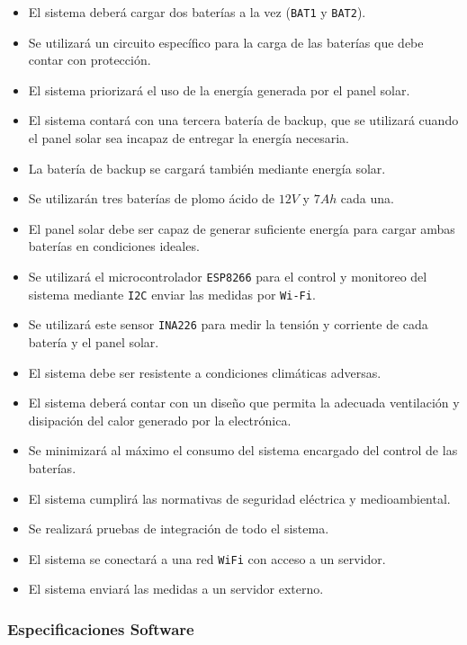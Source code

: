 \begin{itemize}
    \item El sistema deberá cargar dos baterías a la vez (\texttt{BAT1} y \texttt{BAT2}).
    \item Se utilizará un circuito específico para la carga de las baterías que debe contar con protección.
    \item El sistema priorizará el uso de la energía generada por el panel solar.
    \item El sistema contará con una tercera batería de backup, que se utilizará cuando el panel solar sea incapaz de entregar la energía necesaria.
    \item La batería de backup se cargará también mediante energía solar.
    \item Se utilizarán tres baterías de plomo ácido de $12 V$ y $7 Ah$ cada una. 
    \item El panel solar debe ser capaz de generar suficiente energía para cargar ambas baterías en condiciones ideales.
    \item Se utilizará el microcontrolador \texttt{ESP8266} para el control y monitoreo del sistema mediante \texttt{I2C} enviar las medidas por \texttt{Wi-Fi}.
    \item Se utilizará este sensor \texttt{INA226} para medir la tensión y corriente de cada batería y el panel solar.
    \item El sistema debe ser resistente a condiciones climáticas adversas. 
    \item El sistema deberá contar con un diseño que permita la adecuada ventilación y disipación del calor generado por la electrónica.
    \item Se minimizará al máximo el consumo del sistema encargado del control de las baterías.
    \item El sistema cumplirá las normativas de seguridad eléctrica y medioambiental.
    \item Se realizará pruebas de integración de todo el sistema.
    \item El sistema se conectará a una red \texttt{WiFi} con acceso a un servidor.
    \item El sistema enviará las medidas a un servidor externo.
\end{itemize}

\subsubsection{Especificaciones Software}

